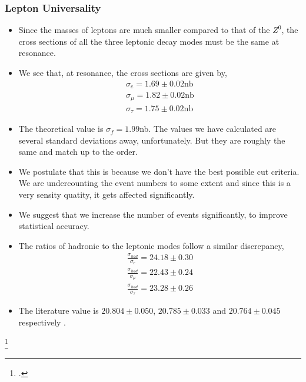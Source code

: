 \documentclass[10pt]{beamer}
\begin{document}
\begin{frame}
\frametitle{Lepton Universality}
\begin{itemize}
  \item Since the masses of leptons are much smaller compared to that of the $Z^0$, the cross sections of all the three leptonic decay modes must be the same at resonance.
  \item We see that, at resonance, the cross sections are given by,
  \begin{equation}
    \begin{split}
        \sigma_e = 1.69 \pm 0.02 \text{nb} \\
        \sigma_{\mu} = 1.82 \pm 0.02 \text{nb} \\
        \sigma_{\tau} = 1.75 \pm 0.02 \text{nb}
    \end{split}
  \end{equation}
  \item The theoretical value is $\sigma_f = 1.99$nb. The values we have calculated are several standard deviations away, unfortunately. But they are roughly the same and match up to the order.
  \item We postulate that this is because we don't have the best possible cut criteria. We are undercounting the event numbers to some extent and since this is a very sensity quatity, it gets affected significantly.
  \item We suggest that we increase the number of events significantly, to improve statistical accuracy.
\end{itemize}
\end{frame}

\begin{frame}
\begin{itemize}
  \item The ratios of hadronic to the leptonic modes follow a similar discrepancy,
  \begin{equation}
    \begin{split}
        \frac{\sigma_{had}}{\sigma_e} = 24.18 \pm 0.30 \\
        \frac{\sigma_{had}}{\sigma_{\mu}} = 22.43 \pm 0.24 \\
        \frac{\sigma_{had}}{\sigma_{\tau}} = 23.28 \pm 0.26
    \end{split}
  \end{equation}
  \item The literature value is $20.804 \pm 0.050$, $20.785 \pm 0.033$ and $20.764 \pm 0.045$ respectively \footnotemark{}.
\end{itemize}
\footcitetext{pdg2}
\end{frame}
\end{document}
